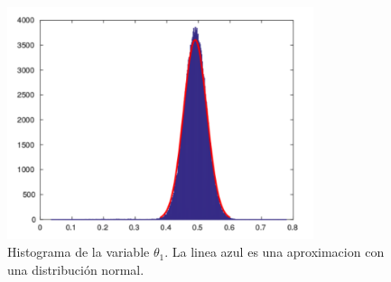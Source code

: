 \begin{figure}[H]
\begin{minipage}{1.0\textwidth}
 \centering
	\includegraphics[width=0.8\textwidth]{imgs/theta1.pdf}
	\caption{\footnotesize Histograma de la variable $\theta_1$. La linea azul es una aproximacion con una distribución normal.}
\end{minipage}
\end{figure}

